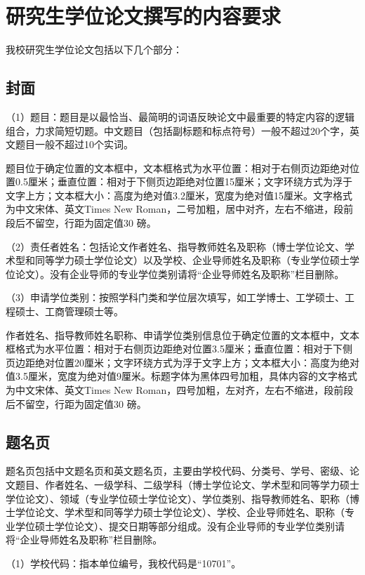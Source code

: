 
\chapter{研究生学位论文撰写的内容要求}

我校研究生学位论文包括以下几个部分：

\section{封面}

（1）题目：题目是以最恰当、最简明的词语反映论文中最重要的特定内容的逻辑组合，力求简短切题。中文题目（包括副标题和标点符号）一般不超过20个字，英文题目一般不超过10个实词。

题目位于确定位置的文本框中，文本框格式为水平位置：相对于右侧页边距绝对位置0.5厘米；垂直位置：相对于下侧页边距绝对位置15厘米；文字环绕方式为浮于文字上方；文本框大小：高度为绝对值3.2厘米，宽度为绝对值15厘米。文字格式为中文宋体、英文Times New Roman，二号加粗，居中对齐，左右不缩进，段前段后不留空，行距为固定值30 磅。

（2）责任者姓名：包括论文作者姓名、指导教师姓名及职称（博士学位论文、学术型和同等学力硕士学位论文）以及学校、企业导师姓名及职称（专业学位硕士学位论文）。没有企业导师的专业学位类别请将“企业导师姓名及职称”栏目删除。

（3）申请学位类别：按照学科门类和学位层次填写，如工学博士、工学硕士、工程硕士、工商管理硕士等。

作者姓名、指导教师姓名职称、申请学位类别信息位于确定位置的文本框中，文本框格式为水平位置：相对于右侧页边距绝对位置3.5厘米；垂直位置：相对于下侧页边距绝对位置20厘米；文字环绕方式为浮于文字上方；文本框大小：高度为绝对值3.5厘米，宽度为绝对值9厘米。标题字体为黑体四号加粗，具体内容的文字格式为中文宋体、英文Times New Roman，四号加粗，左对齐，左右不缩进，段前段后不留空，行距为固定值30 磅。

\section{题名页}

题名页包括中文题名页和英文题名页，主要由学校代码、分类号、学号、密级、论文题目、作者姓名、一级学科、二级学科（博士学位论文、学术型和同等学力硕士学位论文）、领域（专业学位硕士学位论文）、学位类别、指导教师姓名、职称（博士学位论文、学术型和同等学力硕士学位论文）、学校、企业导师姓名、职称（专业学位硕士学位论文）、提交日期等部分组成。没有企业导师的专业学位类别请将“企业导师姓名及职称”栏目删除。

（1）学校代码：指本单位编号，我校代码是“10701”。

